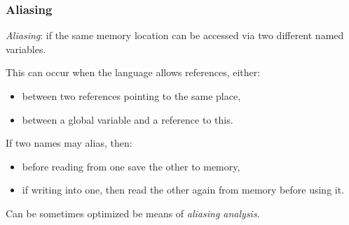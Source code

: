 \documentclass{beamer}
\newcommand{\emp}[1]{\textcolor{DikuRed}{ #1}}
\begin{document}
\begin{frame}
\frametitle{Aliasing}

\emp{\em Aliasing}: if the same memory location can be accessed via two
different named variables.\bigskip


This can occur when the language allows references, either:\smallskip

\begin{itemize}

\item between two references pointing to the same place,\smallskip

\item between a global variable and a reference to this.\smallskip

\end{itemize}

\bigskip

If two names may alias, then:\smallskip

\begin{itemize}

\item before reading from one save the other to memory,\smallskip

\item if writing into one, then read the other again from memory
        before using it.\smallskip

\end{itemize}


Can be sometimes optimized be means of {\em aliasing analysis}.


\end{frame}


\end{document}

